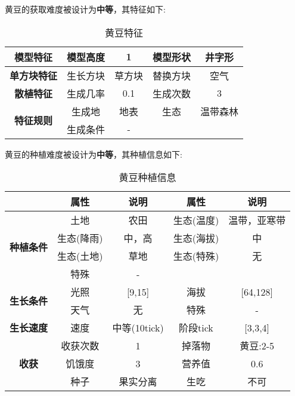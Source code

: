 黄豆的获取难度被设计为\textbf{中等}，其特征如下:
\begin{table}[H]
    \centering
    \caption{黄豆特征}
    \label{table:黄豆特征}
    \setlength{\tabcolsep}{4mm}
    \begin{tabular}{c|cc|cc}
        \toprule
        \textbf{模型特征}                  & 模型高度 & 1      & 模型形状 & 井字形 \\
        \midrule
        \textbf{单方块特征}                & 生长方块 & 草方块 & 替换方块 & 空气   \\
        \midrule
        \textbf{散植特征}                  & 生成几率 & 0.1    & 生成次数 & 3      \\
        \midrule
        \multirow{2}{*}{\textbf{特征规则}} & 生成地   & 地表   & 生态     & 温带森林   \\
                                           & 生成条件 & -              \\
        \bottomrule
    \end{tabular}
\end{table}


黄豆的种植难度被设计为\textbf{中等}，其种植信息如下:

\begin{table}[H]
    \centering
    \caption{黄豆种植信息}
    \label{table:黄豆种植信息}
    \setlength{\tabcolsep}{4mm}
    \begin{tabular}{c|cc|cc}
        \toprule
                                           & \textbf{属性} & \textbf{说明}   & \textbf{属性} & \textbf{说明} \\
        \midrule
        \multirow{4}{*}{\textbf{种植条件}} & 土地          & 农田            & 生态(温度)    & 温带，亚寒带    \\
                                           & 生态(降雨)    & 中，高          & 生态(海拔)    & 中            \\
                                           & 生态(土地)    & 草地            & 生态(特殊)    & 无            \\
                                           & 特殊          & -                                 \\
        \midrule
        \multirow{2}{*}{\textbf{生长条件}} & 光照          & [9,15]         & 海拔          & [64,128]      \\
                                           & 天气          & 无              & 特殊          & -      \\
        \midrule
        \textbf{生长速度}                  & 速度          & 中等(10tick)       & 阶段tick      & [3,3,4]       \\
        \midrule
        \multirow{3}{*}{\textbf{收获}}     & 收获次数      & 1               & 掉落物        & 黄豆:2-5      \\
                                           & 饥饿度        & 3               & 营养值        & 0.6           \\
                                           & 种子          & 果实分离        & 生吃          & 不可          \\
        \bottomrule
    \end{tabular}
\end{table}

